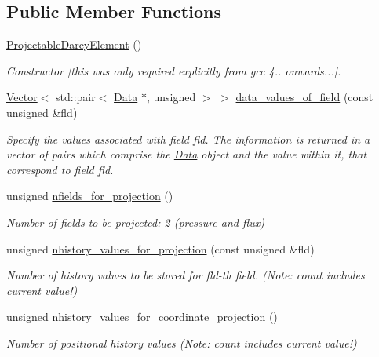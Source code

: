 \subsection*{Public Member Functions}
\begin{DoxyCompactItemize}
\item 
\hyperlink{classoomph_1_1ProjectableDarcyElement_ad32ffacb463b234cc17956c1eb45f222}{Projectable\+Darcy\+Element} ()
\begin{DoxyCompactList}\small\item\em Constructor \mbox{[}this was only required explicitly from gcc 4.. onwards...\mbox{]}. \end{DoxyCompactList}\item 
\hyperlink{classoomph_1_1Vector}{Vector}$<$ std\+::pair$<$ \hyperlink{classoomph_1_1Data}{Data} $\ast$, unsigned $>$ $>$ \hyperlink{classoomph_1_1ProjectableDarcyElement_aa430ac36ed6a03558d66cae979b57a3f}{data\+\_\+values\+\_\+of\+\_\+field} (const unsigned \&fld)
\begin{DoxyCompactList}\small\item\em Specify the values associated with field fld. The information is returned in a vector of pairs which comprise the \hyperlink{classoomph_1_1Data}{Data} object and the value within it, that correspond to field fld. \end{DoxyCompactList}\item 
unsigned \hyperlink{classoomph_1_1ProjectableDarcyElement_ae6daf28fea08e70d77bcdcb5426b0fb9}{nfields\+\_\+for\+\_\+projection} ()
\begin{DoxyCompactList}\small\item\em Number of fields to be projected\+: 2 (pressure and flux) \end{DoxyCompactList}\item 
unsigned \hyperlink{classoomph_1_1ProjectableDarcyElement_aba5e9617dc6346ca4318baf457445da9}{nhistory\+\_\+values\+\_\+for\+\_\+projection} (const unsigned \&fld)
\begin{DoxyCompactList}\small\item\em Number of history values to be stored for fld-\/th field. (Note\+: count includes current value!) \end{DoxyCompactList}\item 
unsigned \hyperlink{classoomph_1_1ProjectableDarcyElement_a32091c680d7793baed0e5294c6143418}{nhistory\+\_\+values\+\_\+for\+\_\+coordinate\+\_\+projection} ()
\begin{DoxyCompactList}\small\item\em Number of positional history values (Note\+: count includes current value!) \end{DoxyCompactList}\item 

\end{DoxyCompactItemize}
